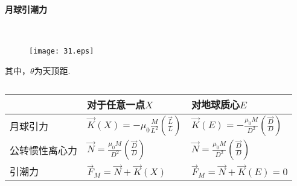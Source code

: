 \documentclass[a4paper,12pt]{article}
\begin{document}
    \paragraph{月球引潮力}~{}
    \begin{figure}[H]
        \centering\texttt{[image: 31.eps]}
        \caption*{}
    \end{figure}
    其中，$\theta$为天顶距.\\
    \begin{table}[htbp]
        \centering 
        \caption*{}
        \begin{tabular}{lll}
            \toprule
            & 对于任意一点$X$ & 对地球质心$E$ \\
            \midrule
        月球引力      &     $\displaystyle \vec{K}(X)=-\mu_0 \frac{M}{L^{2}}\left(\frac{\vec{L}}{L}\right)$     &  $\displaystyle\vec{K}(E)=-\frac{\mu_0 M}{D^{2}}\left(\frac{\vec{D}}{D}\right)$        \\
        公转惯性离心力 &    $\displaystyle\vec{N}=\frac{\mu_0 M}{D^{2}}\left(\frac{\vec{D}}{D}\right)$       &      $\displaystyle\vec{N}=\frac{\mu_0 M}{D^{2}}\left(\frac{\vec{D}}{D}\right)$    \\
        引潮力        &    $\displaystyle\vec{F}_{M}=\vec{N}+\vec{K}(X)$       &    $\displaystyle\vec{F}_{M}=\vec{N}+\vec{K}(E)=0$ \\
        \bottomrule
        \end{tabular}
    \end{table}
\end{document}
